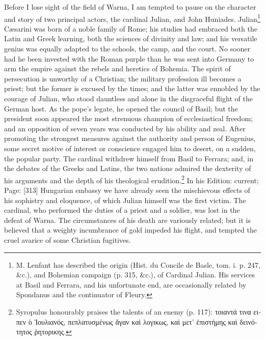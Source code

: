 Before I lose sight of the field of Warna, I am tempted to pause on the character and story of two principal actors, the cardinal Julian, and John Huniades. Julian\footnote{M. Lenfant has described the origin (Hist. du Concile de Basle, tom. i. p. 247, \&c.), and Bohemian campaign (p. 315, \&c.), of Cardinal Julian. His services at Basil and Ferrara, and his unfortunate end, are occasionally related by Spondanus and the continuator of Fleury.} Cæsarini was born of a noble family of Rome; his studies had embraced both the Latin and Greek learning, both the sciences of divinity and law; and his versatile genius was equally adapted to the schools, the camp, and the court. No sooner had he been invested with the Roman purple than he was sent into Germany to arm the empire against the rebels and heretics of Bohemia. The spirit of persecution is unworthy of a Christian; the military profession ill becomes a priest; but the former is excused by the times; and the latter was ennobled by the courage of Julian, who stood dauntless and alone in the disgraceful flight of the German host. As the pope\texthebrew{}’s legate, he opened the council of Basil; but the president soon appeared the most strenuous champion of ecclesiastical freedom; and an opposition of seven years was conducted by his ability and zeal. After promoting the strongest measures against the authority and person of Eugenius, some secret motive of interest or conscience engaged him to desert, on a sudden, the popular party. The cardinal withdrew himself from Basil to Ferrara; and, in the debates of the Greeks and Latins, the two nations admired the dexterity of his arguments and the depth of his theological erudition.\footnote{Syropulus honourably praises the talents of an enemy (p. 117): \textgreek{τοιαντά τινα ειπεν \texthebrew{ὸ Ἰ}ουλιανός, πεπλατυσμένως \texthebrew{ἄ}γαν κα\texthebrew{ὶ} λογικως, κα\texthebrew{ὶ} μετ\texthebrew{’ ἐ}πιστήμης κα\texthebrew{ὶ} δεινότητος \texthebrew{ῥ}ητορικης}.} In his Edition: current; Page: [313] Hungarian embassy we have already seen the mischievous effects of his sophistry and eloquence, of which Julian himself was the first victim. The cardinal, who performed the duties of a priest and a soldier, was lost in the defeat of Warna. The circumstances of his death are variously related; but it is believed that a weighty incumbrance of gold impeded his flight, and tempted the cruel avarice of some Christian fugitives.

